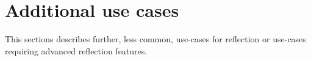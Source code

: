 \section{Additional use cases}
\label{appendix-other-use-cases}

This sections describes further, less common, use-cases for reflection or use-cases
requiring advanced reflection features.





